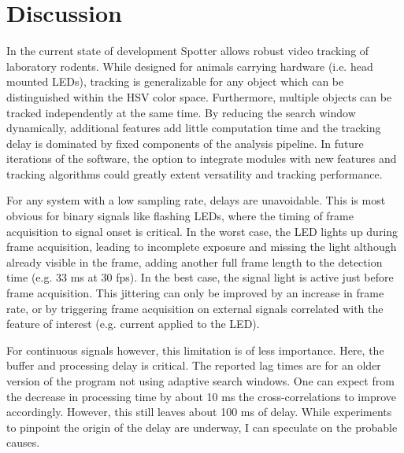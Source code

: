 \newpage
\section{Discussion}
\label{sec:discussion}
In the current state of development Spotter allows robust video tracking of laboratory rodents. While designed for animals carrying hardware (i.e. head mounted LEDs), tracking is generalizable for any object which can be distinguished within the HSV color space. Furthermore, multiple objects can be tracked independently at the same time. By reducing the search window dynamically, additional features add little computation time and the tracking delay is dominated by fixed components of the analysis pipeline. In future iterations of the software, the option to integrate modules with new features and tracking algorithms could greatly extent versatility and tracking performance.

For any system with a low sampling rate, delays are unavoidable. This is most obvious for binary signals like flashing LEDs, where the timing of frame acquisition to signal onset is critical. In the worst case, the LED lights up during frame acquisition, leading to incomplete exposure and missing the light although already visible in the frame, adding another full frame length to the detection time (e.g. 33 ms at 30 fps). In the best case, the signal light is active just before frame acquisition. This jittering can only be improved by an increase in frame rate, or by triggering frame acquisition on external signals correlated with the feature of interest (e.g. current applied to the LED).

For continuous signals however, this limitation is of less importance. Here, the buffer and processing delay is critical. The reported lag times are for an older version of the program not using adaptive search windows. One can expect from the decrease in processing time by about 10 ms the cross-correlations to improve accordingly. However, this still leaves about 100 ms of delay. While experiments to pinpoint the origin of the delay are underway, I can speculate on the probable causes.

